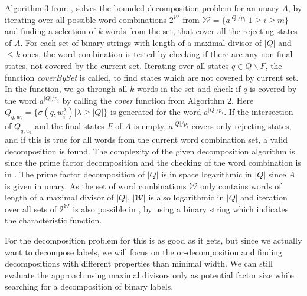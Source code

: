 Algorithm 3 from \cite{DBLP:journals/corr/abs-2107-04683}, solves the bounded decomposition problem for an unary \DFA $A$, by iterating over all possible word combinations $2^\mathcal{W}$ from  $\mathcal{W} = \{a^{|Q|/p_i} | 1 \geq i \geq m\}$ and finding a selection of $k$ words from the set, that cover all the rejecting states of $A$.
For each set of binary strings with length of a maximal divisor of $|Q|$ and $\leq k$ ones, the word combination is tested by checking if there are any non final states, not covered by the current set.
Iterating over all states $q \in Q \backslash F$, the function \textit{coverBySet} is called, to find states which are not covered by current set.
In the function, we go through all $k$ words in the set and check if $q$ is covered by the word $a^{|Q|/p_i}$ by calling the \textit{cover} function from Algorithm 2. Here $Q_{q,w_i} = \{\sigma(q,w^\lambda_i)|\lambda \geq |Q|\}$ is generated for the word $a^{|Q|/p_i}$.
If the intersection of $Q_{q,w_i}$ and the final states $F$ of $A$ is empty, $a^{|Q|/p_i}$ covers only rejecting states, and if this is true for all words from the current word combination set, a valid decomposition is found.
The complexity of the given decomposition algorithm is \LogSpace since the prime factor decomposition and the checking of the word combination is in \LogSpace.
The prime factor decomposition of $|Q|$ is in space logarithmic in $|Q|$ since $A$ is given in unary.
As the set of word combinations $\mathcal{W}$ only contains words of length of a maximal divisor of $|Q|$, $|\mathcal{W}|$ is also logarithmic in $|Q|$ and iteration over all sets of $2^\mathcal{W}$ is also possible in \LogSpace, by using a binary string which indicates the characteristic function.

For the decomposition problem for \DFAs this is as good as it gets, but since we actually want to decompose labels, we will focus on the or-decomposition and finding decompositions with different properties than minimal width. We can still evaluate the approach using maximal divisors only as potential factor size while searching for a decomposition of binary labels.
